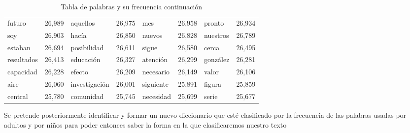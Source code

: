 \begin{table}
\begin{tabular}{|l|l|l|l|l|l|l|l|}
   futuro	  & 26,989	 &
   aquellos	  & 26,975	   &
   mes 	  & 26,958	  &
   pronto	&   26,934	   \\
   soy 	  & 26,903	   &
   hac\'ia	&   26,850	   &
   nuevos 	&   26,828	 &
   nuestros	 &  26,789	   \\
   estaban 	 &  26,694	   &
   posibilidad	&   26,611	   &
   sigue	 &  26,580	  &
   cerca	 &  26,495	  \\
   resultados	&   26,413	  &
   educaci\'on 	&   26,327	&
   atenci\'on	&   26,299	  &
   gonz\'alez 	 &  26,281	   \\
   capacidad 	 &  26,228	   &
   efecto	  & 26,209	  &
   necesario	&   26,149	   &
   valor	  & 26,106	 \\
   aire	  & 26,060	   &
   investigaci\'on	&   26,001	 &
   siguiente	  & 25,891	  &
   figura	  & 25,859	 \\
   central	  & 25,780	   &
   comunidad  	&   25,745	 &
   necesidad 	 &  25,699	&
   serie	  & 25,677	\\
   
   \hline
   
   
   \end{tabular}

\caption{Tabla de palabras y su frecuencia continuaci\'on} 
\end{table}
     

   	

Se pretende posteriormente identificar y formar un nuevo diccionario que est\'e clasificado por la frecuencia de las palabras usadas por adultos y por ni\~nos para poder entonces saber la forma en la que clasificaremos nuestro texto